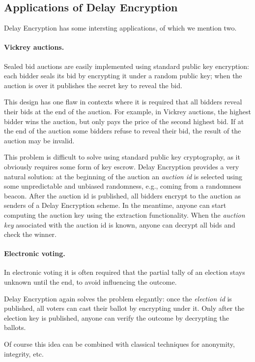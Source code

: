 \documentclass{llncs}
\begin{document}
\subsection{Applications of Delay Encryption}

Delay Encryption has some intersting applications, of which we mention
two.

\paragraph{Vickrey auctions.} Sealed bid auctions are easily
implemented using standard public key encryption: each bidder seals
its bid by encrypting it under a random public key; when the auction
is over it publishes the secret key to reveal the bid.

This design has one flaw in contexts where it is required that all
bidders reveal their bids at the end of the auction. %
For example, in Vickrey auctions, the highest bidder wins the auction,
but only pays the price of the second highest bid. %
If at the end of the auction some bidders refuse to reveal their bid,
the result of the auction may be invalid.

This problem is difficult to solve using standard public key
cryptography, as it obviously requires some form of key escrow. %
Delay Encryption provides a very natural solution: at the beginning of
the auction an \emph{auction id} is selected using some unpredictable
and unbiased randomness, e.g., coming from a randomness beacon. %
After the auction id is published, all bidders encrypt to the auction
as senders of a Delay Encryption scheme. %
In the meantime, anyone can start computing the auction key using the
extraction functionality. %
When the \emph{auction key} associated with the auction id is known,
anyone can decrypt all bids and check the winner.

\paragraph{Electronic voting.} In electronic voting it is often
required that the partial tally of an election stays unknown until the
end, to avoid influencing the outcome. %

Delay Encryption again solves the problem elegantly: once the
\emph{election id} is published, all voters can cast their ballot by
encrypting under it. %
Only after the election key is published, anyone can verify the
outcome by decrypting the ballots. %

Of course this idea can be combined with classical techniques for
anonymity, integrity, etc.
\end{document}
